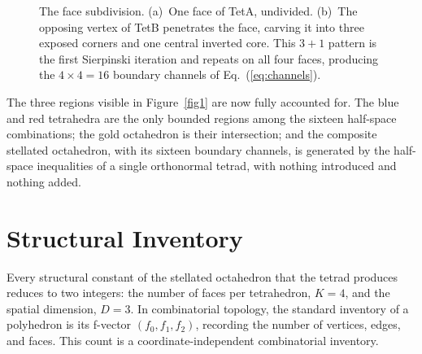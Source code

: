 \documentclass[twocolumn]{iopjournal}
\begin{document}
\begin{figure}[t]
\centering
{}
\caption{The face subdivision. (a)~One face of TetA, undivided. (b)~The opposing vertex of TetB penetrates the face, carving it into three exposed corners and one central inverted core. This $3+1$ pattern is the first Sierpinski iteration and repeats on all four faces, producing the $4 \times 4 = 16$ boundary channels of Eq.~(\ref{eq:channels}).}
\label{fig2}
\end{figure}

The three regions visible in Figure~\ref{fig1} are now fully accounted
for. The blue and red tetrahedra are the only bounded regions among the
sixteen half-space combinations; the gold octahedron is their intersection;
and the composite stellated octahedron, with its sixteen boundary channels,
is generated by the half-space inequalities of a single orthonormal tetrad,
with nothing introduced and nothing added.


\section*{Structural Inventory}

Every structural constant of the stellated octahedron that the tetrad produces reduces to two integers: the number of faces per tetrahedron, $K = 4$, and the spatial dimension, $D = 3$. In combinatorial topology, the standard inventory of a polyhedron is its f-vector $(f_0, f_1, f_2)$, recording the number of vertices, edges, and faces. This count is a coordinate-independent combinatorial inventory.
\end{document}
